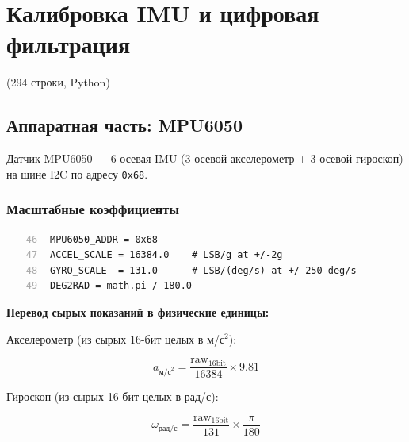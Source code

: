 \chapter{Калибровка IMU и цифровая фильтрация}
\label{ch:imu_calibration}

\begin{filebox}[title={Файл исходного кода}]
 \quad (294 строки, Python)
\end{filebox}

\section{Аппаратная часть: MPU6050}

Датчик MPU6050 --- 6-осевая IMU (3-осевой акселерометр + 3-осевой гироскоп)
на шине I2C по адресу \texttt{0x68}.

\subsection{Масштабные коэффициенты}

\begin{filebox}[title={\filepath{imu\_node.py}, строки 46--55}]
\begin{lstlisting}[style=pythonstyle, numbers=left, firstnumber=46]
MPU6050_ADDR = 0x68
ACCEL_SCALE = 16384.0    # LSB/g at +/-2g
GYRO_SCALE  = 131.0      # LSB/(deg/s) at +/-250 deg/s
DEG2RAD = math.pi / 180.0
\end{lstlisting}
\end{filebox}

\textbf{Перевод сырых показаний в физические единицы:}

Акселерометр (из сырых 16-бит целых в м/с$^2$):

\begin{equation}
  a_{\text{м/с}^2} = \frac{\text{raw}_{16\text{bit}}}{16384} \times 9.81
  \label{eq:accel_scale}
\end{equation}

Гироскоп (из сырых 16-бит целых в рад/с):

\begin{equation}
  \omega_{\text{рад/с}} = \frac{\text{raw}_{16\text{bit}}}{131} \times \frac{\pi}{180}
  \label{eq:gyro_scale}
\end{equation}

